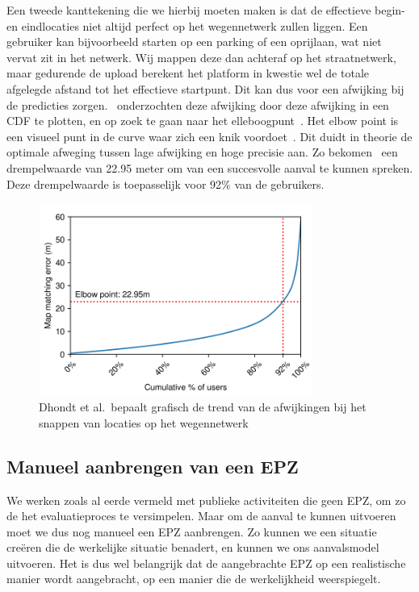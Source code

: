 Een tweede kanttekening die we hierbij moeten maken is dat de effectieve begin-
en eindlocaties niet altijd perfect op het wegennetwerk zullen liggen. Een
gebruiker kan bijvoorbeeld starten op een parking of een oprijlaan, wat niet
vervat zit in het netwerk. Wij mappen deze dan achteraf op het straatnetwerk,
maar gedurende de upload berekent het platform in kwestie wel de totale
afgelegde afstand tot het effectieve startpunt. Dit kan dus voor een afwijking
bij de predicties zorgen.~\citeauthor{Dhondt} onderzochten deze afwijking door
deze afwijking in een \ac{CDF} te plotten, en op zoek te gaan naar het
elleboogpunt~\cite{Dhondt}. Het elbow point is een visueel punt in de curve
waar zich een knik voordoet~\cite{Introduc22:online}. Dit duidt in theorie de
optimale afweging tussen lage afwijking en hoge precisie aan. Zo
bekomen~\citeauthor{Dhondt} een drempelwaarde van 22.95 meter om van een
succesvolle aanval te kunnen spreken. Deze drempelwaarde is toepasselijk voor
92\% van de gebruikers.
\begin{figure}[h]
    \centering
    \includegraphics[width=0.8\textwidth]{fig/Afwijkingen&Analyses/OvershootMappingDistance.png}
    \caption{Dhondt et al.\ bepaalt grafisch de trend van de afwijkingen bij het snappen van locaties op het wegennetwerk~\cite{Dhondt}}\label{fig:overshootMappingDistance}
\end{figure}

\subsection{Manueel aanbrengen van een EPZ}\label{sec:zelf_cloaking}
We werken zoals al eerde vermeld met publieke activiteiten die geen \ac{EPZ},
om zo de het evaluatieproces te versimpelen. Maar om de aanval te kunnen
uitvoeren moet we dus nog manueel een \ac{EPZ} aanbrengen. Zo kunnen we een
situatie creëren die de werkelijke situatie benadert, en kunnen we ons
aanvalsmodel uitvoeren. Het is dus wel belangrijk dat de aangebrachte \ac{EPZ}
op een realistische manier wordt aangebracht, op een manier die de
werkelijkheid weerspiegelt.

